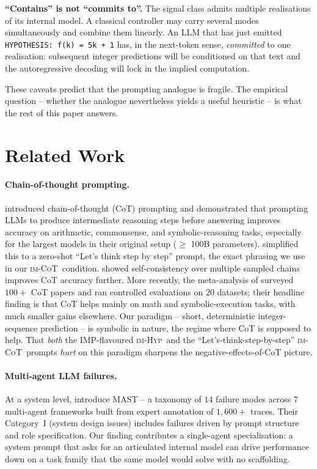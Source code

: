 \documentclass[11pt]{article}
\newcommand{\imhyp}{\textsc{im-Hyp}}
\newcommand{\imcot}{\textsc{im-CoT}}
\begin{document}
\textbf{``Contains'' is not ``commits to''.}  The signal class
admits multiple realisations of its internal model.  A classical
controller may carry several modes simultaneously and combine them
linearly.  An LLM that has just emitted
\verb|HYPOTHESIS: f(k) = 5k + 1| has, in the next-token sense,
\emph{committed} to one realisation:  subsequent integer
predictions will be conditioned on that text and the autoregressive
decoding will lock in the implied computation.

These caveats predict that the prompting analogue is fragile.
The empirical question -- whether the analogue nevertheless yields
a useful heuristic -- is what the rest of this paper answers.

\section{Related Work}
\label{sec:related}

\paragraph{Chain-of-thought prompting.}
\citet{wei2022chain} introduced chain-of-thought (CoT) prompting and
demonstrated that prompting LLMs to produce intermediate reasoning
steps before answering improves accuracy on arithmetic, commonsense,
and symbolic-reasoning tasks, especially for the largest models in
their original setup ($\geq$ 100B parameters).
\citet{kojima2022zero} simplified this to a zero-shot
``Let's think step by step'' prompt, the exact phrasing we use in
our \imcot\ condition.  \citet{wang2023self} showed self-consistency
over multiple sampled chains improves CoT accuracy further.  More
recently, the meta-analysis of \citet{sprague2024cot} surveyed
$100+$ CoT papers and ran controlled evaluations on $20$ datasets;
their headline finding is that CoT helps mainly on math and
symbolic-execution tasks, with much smaller gains elsewhere.
Our paradigm -- short, deterministic integer-sequence prediction --
is symbolic in nature, the regime where CoT is supposed to help.
That \emph{both} the IMP-flavoured \imhyp\ and the
``Let's-think-step-by-step'' \imcot\ prompts \emph{hurt} on this
paradigm sharpens the negative-effects-of-CoT picture.

\paragraph{Multi-agent LLM failures.}
At a system level, \citet{cemri2025why} introduce MAST -- a taxonomy
of $14$ failure modes across $7$ multi-agent frameworks built from
expert annotation of $1{,}600+$ traces.  Their Category~I (system
design issues) includes failures driven by prompt structure and
role specification.  Our finding contributes a single-agent
specialisation: a system prompt that asks for an articulated
internal model can drive performance down on a task family that the
same model would solve with no scaffolding.
\end{document}
